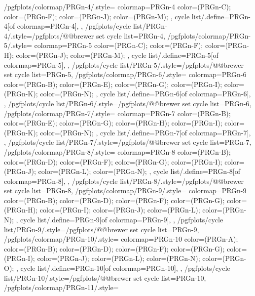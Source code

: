 {  %
  /pgfplots/colormap/PRGn-4/.style={
    colormap={PRGn-4}{
      color=(PRGn-C);
      color=(PRGn-F);
      color=(PRGn-J);
      color=(PRGn-M);
    },
    cycle list/.define={PRGn-4}{[of colormap=PRGn-4]},
  },
  /pgfplots/cycle list/PRGn-4/.style={/pgfplots/@@brewer set cycle list={PRGn-4}},
  /pgfplots/colormap/PRGn-5/.style={
    colormap={PRGn-5}{
      color=(PRGn-C);
      color=(PRGn-F);
      color=(PRGn-H);
      color=(PRGn-J);
      color=(PRGn-M);
    },
    cycle list/.define={PRGn-5}{[of colormap=PRGn-5]},
  },
  /pgfplots/cycle list/PRGn-5/.style={/pgfplots/@@brewer set cycle list={PRGn-5}},
  /pgfplots/colormap/PRGn-6/.style={
    colormap={PRGn-6}{
      color=(PRGn-B);
      color=(PRGn-E);
      color=(PRGn-G);
      color=(PRGn-I);
      color=(PRGn-K);
      color=(PRGn-N);
    },
    cycle list/.define={PRGn-6}{[of colormap=PRGn-6]},
  },
  /pgfplots/cycle list/PRGn-6/.style={/pgfplots/@@brewer set cycle list={PRGn-6}},
  /pgfplots/colormap/PRGn-7/.style={
    colormap={PRGn-7}{
      color=(PRGn-B);
      color=(PRGn-E);
      color=(PRGn-G);
      color=(PRGn-H);
      color=(PRGn-I);
      color=(PRGn-K);
      color=(PRGn-N);
    },
    cycle list/.define={PRGn-7}{[of colormap=PRGn-7]},
  },
  /pgfplots/cycle list/PRGn-7/.style={/pgfplots/@@brewer set cycle list={PRGn-7}},
  /pgfplots/colormap/PRGn-8/.style={
    colormap={PRGn-8}{
      color=(PRGn-B);
      color=(PRGn-D);
      color=(PRGn-F);
      color=(PRGn-G);
      color=(PRGn-I);
      color=(PRGn-J);
      color=(PRGn-L);
      color=(PRGn-N);
    },
    cycle list/.define={PRGn-8}{[of colormap=PRGn-8]},
  },
  /pgfplots/cycle list/PRGn-8/.style={/pgfplots/@@brewer set cycle list={PRGn-8}},
  /pgfplots/colormap/PRGn-9/.style={
    colormap={PRGn-9}{
      color=(PRGn-B);
      color=(PRGn-D);
      color=(PRGn-F);
      color=(PRGn-G);
      color=(PRGn-H);
      color=(PRGn-I);
      color=(PRGn-J);
      color=(PRGn-L);
      color=(PRGn-N);
    },
    cycle list/.define={PRGn-9}{[of colormap=PRGn-9]},
  },
  /pgfplots/cycle list/PRGn-9/.style={/pgfplots/@@brewer set cycle list={PRGn-9}},
  /pgfplots/colormap/PRGn-10/.style={
    colormap={PRGn-10}{
      color=(PRGn-A);
      color=(PRGn-B);
      color=(PRGn-D);
      color=(PRGn-F);
      color=(PRGn-G);
      color=(PRGn-I);
      color=(PRGn-J);
      color=(PRGn-L);
      color=(PRGn-N);
      color=(PRGn-O);
    },
    cycle list/.define={PRGn-10}{[of colormap=PRGn-10]},
  },
  /pgfplots/cycle list/PRGn-10/.style={/pgfplots/@@brewer set cycle list={PRGn-10}},
  /pgfplots/colormap/PRGn-11/.style={
}}
